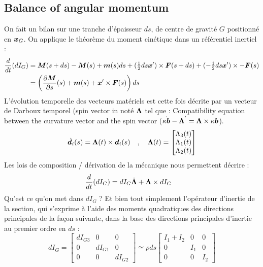 \subsection{Balance of angular momentum}
On fait un bilan sur une tranche d'épaisseur $ds$, de centre de gravité $G$ positionné en $\boldsymbol{x}_G$. On applique le théorème du moment cinétique dans un référentiel inertiel :
\begin{equation}
	\begin{aligned}
		\frac{d}{dt}(dI_G) &=
		\boldsymbol{M}(s+ds)-\boldsymbol{M}(s) + \boldsymbol{m}(s)ds
		+ (\tfrac{1}{2}ds\boldsymbol{x}')\times \boldsymbol{F}(s+ds) + (-\tfrac{1}{2}ds\boldsymbol{x}')\times -\boldsymbol{F}(s)\\
		&= \left(\frac{\partial \boldsymbol{M}}{\partial s}(s)+\boldsymbol{m}(s) + \boldsymbol{x}'\times \boldsymbol{F}(s)\right)ds
	\end{aligned}
\end{equation}
L'évolution temporelle des vecteurs matériels est cette fois décrite par un vecteur de Darboux temporel (spin vector in \cite{Bernard1993} noté $\boldsymbol{\Lambda}$ tel que :
Compatibility equation between the curvature vector and the spin vector ($\dot{\kappa\boldsymbol{b}} - \boldsymbol{\Lambda}^{'} = \boldsymbol{\Lambda} \times \kappa\boldsymbol{b}$).
\begin{equation}
	\dot{\boldsymbol{d}_{i}}(s) =\boldsymbol{\Lambda}(t) \times \boldsymbol{d}_i(s)	\quad,\quad
	\boldsymbol{\Lambda}(t)
	=
	\begin{bmatrix}
		\Lambda_3(t) \\
		\Lambda_1(t) \\
		\Lambda_2(t)
	\end{bmatrix}
\end{equation}
Les lois de composition / dérivation de la mécanique nous permettent décrire :
\begin{equation}
	\begin{aligned}
		\frac{d}{dt}(dI_G) &= dI_G\dot{\boldsymbol{\Lambda}} + \boldsymbol{\Lambda}\times dI_G
	\end{aligned}
\end{equation}
Qu'est ce qu'on met dans $dI_G$ ? Et bien tout simplement l'opérateur d'inertie de la section, qui s'exprime à l'aide des moments quadratiques des directions principales de la façon suivante, dans la base des directions principales d'inertie au premier ordre en $ds$ :
\begin{equation}
	dI_G =
	 \begin{bmatrix}
			dI_{G3} & 0 & 0 \\
			0 & dI_{G1} & 0 \\
			0 & 0 & dI_{G2}
	\end{bmatrix}
	\simeq \rho ds
		\begin{bmatrix}
			I_1 + I_2 & 0 & 0 \\
			0 & I_1 & 0 \\
			0 & 0 & I_2
		\end{bmatrix}
\end{equation}
